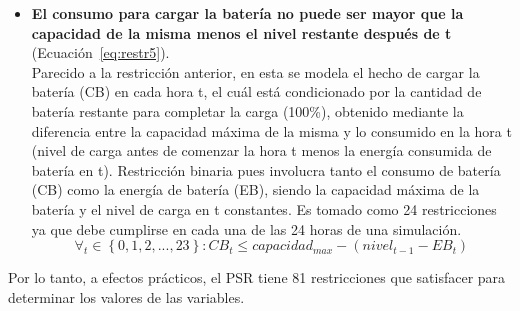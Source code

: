 \begin{itemize}
\item \textbf{El consumo para cargar la batería no puede ser mayor que la capacidad de la misma menos el nivel restante después de t} (Ecuación~\ref{eq:restr5}).\\Parecido a la restricción anterior, en esta se modela el hecho de cargar la batería (CB) en cada hora t, el cuál está condicionado por la cantidad de batería restante para completar la carga (100\%), obtenido mediante la diferencia entre la capacidad máxima de la misma y lo consumido en la hora t (nivel de carga antes de comenzar la hora t menos la energía consumida de batería en t). Restricción binaria pues involucra tanto el consumo de batería (CB) como la energía de batería (EB), siendo la capacidad máxima de la batería y el nivel de carga en t constantes. Es tomado como 24 restricciones ya que debe cumplirse en cada una de las 24 horas de una simulación.
\begin{equation}
        \label{eq:restr5}
        \forall_{t} \in \left\{ 0, 1, 2, ..., 23 \right\} : CB_{t} \leq capacidad_{max}- (nivel_{t-1} - EB_{t})
\end{equation}

\end{itemize}

Por lo tanto, a efectos prácticos, el PSR tiene 81 restricciones que satisfacer para determinar los valores de las variables.

